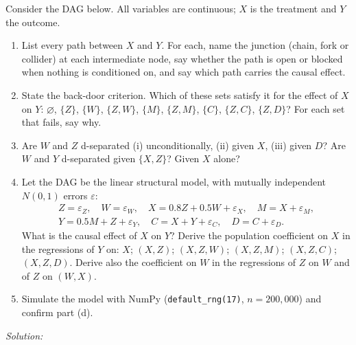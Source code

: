 \documentclass[11pt,a4paper]{article}
\newif\ifsolucoes
\newcommand{\espacoresol}{4.5cm}   %
\newcommand{\resolespaco}{\ifsolucoes\else\par\textit{Solution:}\vspace{\espacoresol}\par\fi}
\begin{document}
\noindent Consider the DAG below. All variables are continuous; $X$ is the treatment and $Y$ the outcome.
\begin{center}
\end{center}
\begin{enumerate}[label=(\alph*)]
\item List every path between $X$ and $Y$. For each, name the junction (chain, fork or collider) at each
intermediate node, say whether the path is open or blocked when nothing is conditioned on, and say which
path carries the causal effect.
\item State the back-door criterion. Which of these sets satisfy it for the effect of $X$ on $Y$:
$\varnothing$, $\{Z\}$, $\{W\}$, $\{Z,W\}$, $\{M\}$, $\{Z,M\}$, $\{C\}$, $\{Z,C\}$, $\{Z,D\}$? For each set
that fails, say why.
\item Are $W$ and $Z$ d-separated (i) unconditionally, (ii) given $X$, (iii) given $D$? Are $W$ and $Y$
d-separated given $\{X,Z\}$? Given $X$ alone?
\item Let the DAG be the linear structural model, with mutually independent $N(0,1)$ errors $\varepsilon$:
\begin{gather*}
Z=\varepsilon_Z,\quad W=\varepsilon_W,\quad X=0.8Z+0.5W+\varepsilon_X,\quad M=X+\varepsilon_M,\\
Y=0.5M+Z+\varepsilon_Y,\quad C=X+Y+\varepsilon_C,\quad D=C+\varepsilon_D.
\end{gather*}
What is the causal effect of $X$ on $Y$? Derive the population coefficient on $X$ in the regressions of $Y$
on: $X$; $(X,Z)$; $(X,Z,W)$; $(X,Z,M)$; $(X,Z,C)$; $(X,Z,D)$. Derive also the coefficient on $W$ in the
regressions of $Z$ on $W$ and of $Z$ on $(W,X)$.
\item Simulate the model with NumPy (\texttt{default\_rng(17)}, $n=200{,}000$) and confirm part (d).
\end{enumerate}
\resolespaco
\end{document}
